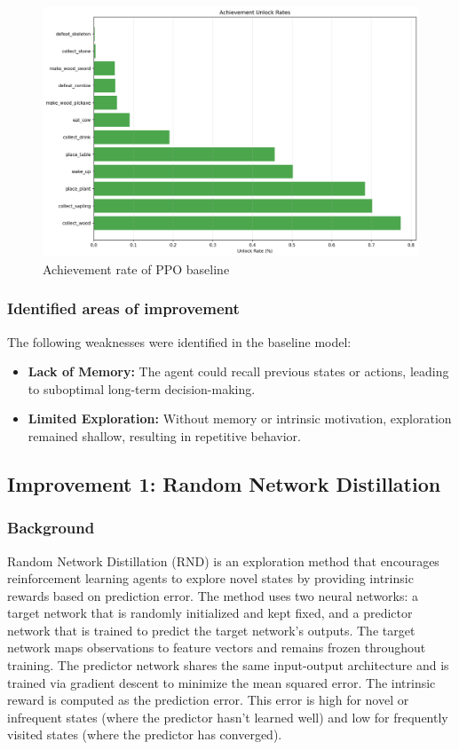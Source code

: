 \documentclass[twocolumn]{article}
\begin{document}
\begin{figure}[H]
    \centering
    \includegraphics[width=0.75\linewidth]{images/achievement_rates_ppo_baseline_1000_episodes.png}
    \caption{Achievement rate of PPO baseline}
    \label{fig:placeholder}
\end{figure}
\subsubsection*{Identified areas of improvement}
The following weaknesses were identified in the baseline model:
\begin{itemize}
    \item \textbf{Lack of Memory:} The agent could recall previous states or actions, leading to suboptimal long-term decision-making.
    \item \textbf{Limited Exploration:} Without memory or intrinsic motivation, exploration remained shallow, resulting in repetitive behavior.
\end{itemize}


\subsection*{Improvement 1: Random Network Distillation}
\subsubsection*{Background}
Random Network Distillation (RND) is an exploration method that encourages reinforcement learning agents to explore novel states by providing intrinsic rewards based on prediction error. The method uses two neural networks: a target network that is randomly initialized and kept fixed, and a predictor network that is trained to predict the target network's outputs. The target network maps observations to feature vectors and remains frozen throughout training. The predictor network shares the same input-output architecture and is trained via gradient descent to minimize the mean squared error. The intrinsic reward is computed as the prediction error. This error is high for novel or infrequent states (where the predictor hasn't learned well) and low for frequently visited states (where the predictor has converged). \parencite{burda2018exploration}
\end{document}
